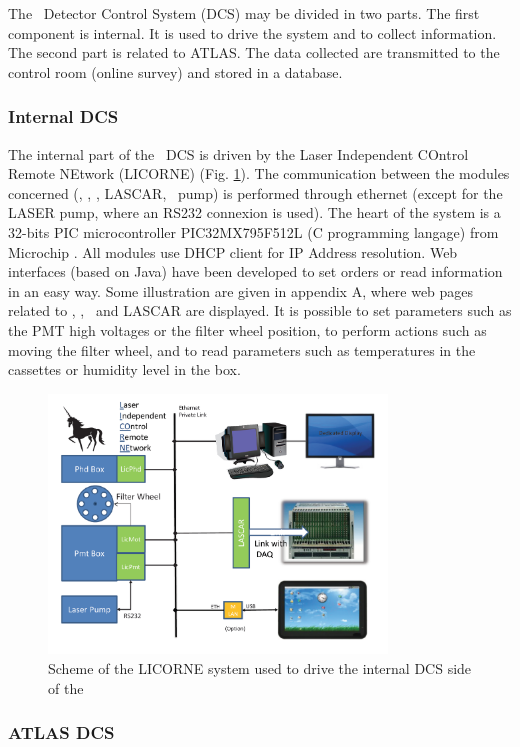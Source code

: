 The \las~Detector Control System (DCS) may be divided in two parts. The first component is internal. It is used to drive the system and to collect information. The second part is related to ATLAS. The data collected are transmitted to the control room (online survey) and stored in a database.

\subsubsection{Internal DCS}

The internal part of the \las~DCS is driven by the Laser Independent COntrol Remote NEtwork (LICORNE) (Fig. \ref{fig:laslicorne}). The communication between the modules concerned (\licpmot, \licphd, \licpmt, LASCAR, \laser~pump) is performed through ethernet (except for the LASER pump, where an RS232 connexion is used). The heart of the system is a 32-bits PIC microcontroller PIC32MX795F512L (C programming langage) from Microchip \cite{ref:picmicro}. All modules use DHCP client for IP Address resolution. Web interfaces (based on Java) have been developed to set orders or read information in an easy way. Some illustration are given in appendix A, where web pages related to  \licpmot, \licphd, \licpmt~and LASCAR are displayed. It is possible to set parameters such as the PMT high voltages or the filter wheel position, to perform actions such as moving the filter wheel, and to read parameters such as temperatures in the cassettes or humidity level in the \phocal box.


\begin{figure}[htbp]
\centering
\includegraphics[width=9cm]{figures/licorne.pdf}
\caption{Scheme of the LICORNE system used to drive the internal DCS side of the \las}\label{fig:laslicorne}
\end{figure}

\subsubsection{ATLAS DCS}

